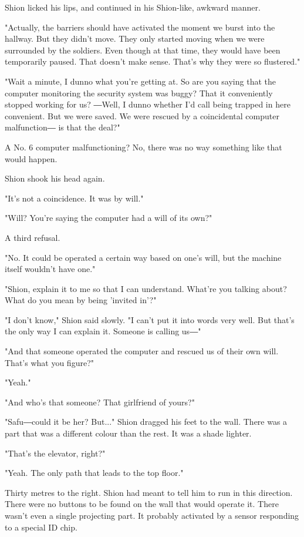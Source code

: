 Shion licked his lips, and continued in his Shion-like, awkward manner.

"Actually, the barriers should have activated the moment we burst into
the hallway. But they didn't move. They only started moving when we were
surrounded by the soldiers. Even though at that time, they would have
been temporarily paused. That doesn't make sense. That's why they were
so flustered."

"Wait a minute, I dunno what you're getting at. So are you saying that
the computer monitoring the security system was buggy? That it
conveniently stopped working for us? ―Well, I dunno whether I'd call
being trapped in here convenient. But we were saved. We were rescued by
a coincidental computer malfunction― is that the deal?"

A No. 6 computer malfunctioning? No, there was no way something like
that would happen.~

Shion shook his head again.

"It's not a coincidence. It was by will."

"Will? You're saying the computer had a will of its own?"

A third refusal.

"No. It could be operated a certain way based on one's will, but the
machine itself wouldn't have one."

"Shion, explain it to me so that I can understand. What're you talking
about? What do you mean by being 'invited in'?"

"I don't know," Shion said slowly. "I can't put it into words very well.
But that's the only way I can explain it. Someone is calling us―"

"And that someone operated the computer and rescued us of their own
will. That's what you figure?"

"Yeah."

"And who's that someone? That girlfriend of yours?"

"Safu―could it be her? But..." Shion dragged his feet to the wall. There
was a part that was a different colour than the rest. It was a shade
lighter.

"That's the elevator, right?"

"Yeah. The only path that leads to the top floor."

Thirty metres to the right. Shion had meant to tell him to run in this
direction. There were no buttons to be found on the wall that would
operate it. There wasn't even a single projecting part. It probably
activated by a sensor responding to a special ID chip.

